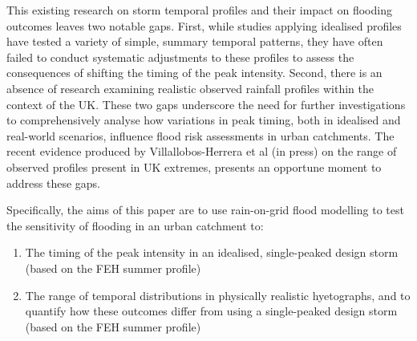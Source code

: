 \documentclass[APA,Times2COL]{WileyNJDv5}
\begin{document}
This existing research on storm temporal profiles and their impact on flooding outcomes leaves two notable gaps. First, while studies applying idealised profiles have tested a variety of simple, summary temporal patterns, they have often failed to conduct systematic adjustments to these profiles to assess the consequences of shifting the timing of the peak intensity. Second, there is an absence of research examining realistic observed rainfall profiles within the context of the UK. These two gaps underscore the need for further investigations to comprehensively analyse how variations in peak timing, both in idealised and real-world scenarios, influence flood risk assessments in urban catchments. The recent evidence produced by Villallobos-Herrera et al (in press) on the range of observed profiles present in UK extremes, presents an opportune moment to address these gaps. 

Specifically, the aims of this paper are to use rain-on-grid flood modelling to test the sensitivity of flooding in an urban catchment to:

\begin{enumerate}
  \item The timing of the peak intensity in an idealised, single-peaked design storm (based on the FEH summer profile)
  \item The range of temporal distributions in physically realistic hyetographs, and to quantify how these outcomes differ from using a single-peaked design storm (based on the FEH summer profile)
\end{enumerate}
\end{document}
